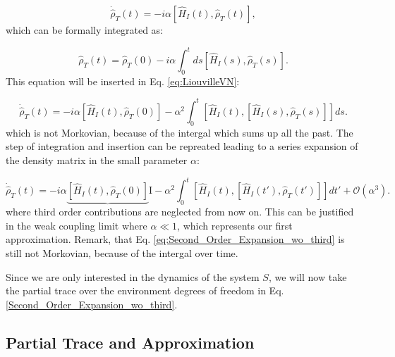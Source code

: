 \begin{equation}
	\dot{\hat{\rho}}_T(t) = -i \alpha [\hat{H}_I(t), \hat{\rho}_T(t)],
	\label{eq:LiouvilleVN}
\end{equation}
which can be formally integrated as:

\begin{equation}
	\hat{\rho}_T(t) = \hat{\rho}_T(0) - i \alpha \int_0^t ds [\hat{H}_I(s), \hat{\rho}_T(s)].
	\label{eq:Formal_Integration}
\end{equation}
This equation will be inserted in Eq. \eqref{eq:LiouvilleVN}:

\begin{equation}
	\dot{\hat{\rho}}_T(t) = -i \alpha \left[ \hat{H}_I(t), \hat{\rho}_T(0) \right]
	- \alpha^2 \int_0^t \left[ \hat{H}_I(t), \left[ \hat{H}_I(s), \hat{\rho}_T(s) \right] \right] ds.
	\label{eq:Second_Order_Expansion}
\end{equation}
which is not Morkovian, because of the intergal which sums up all the past.
The step of integration and insertion can be repreated leading to a series expansion of the density matrix in the small parameter $\alpha$:

\begin{equation}
	\dot{\hat{\rho}}_T(t) = -i \alpha \underbrace{\left[ \hat{H}_I(t), \hat{\rho}_T(0) \right]}{\text{I}}
	- \alpha^2 \int_0^t \left[ \hat{H}_I(t), \left[ \hat{H}_I(t'), \hat{\rho}_T(t') \right] \right] dt' + \mathcal{O} (\alpha^3).
	\label{eq:Second_Order_Expansion_wo_third}
\end{equation}
where third order contributions are neglected from now on.
This can be justified in the weak coupling limit where $ \alpha \ll 1 $, which represents our first approximation.
Remark, that Eq. \eqref{eq:Second_Order_Expansion_wo_third} is still not Morkovian, because of the intergal over time.

Since we are only interested in the dynamics of the system $ S $, we will now take the partial trace over the environment degrees of freedom in Eq. \eqref{Second_Order_Expansion_wo_third}.


\subsection{Partial Trace and Approximation}
\label{subsec:Partial_Trace_Approximation}

